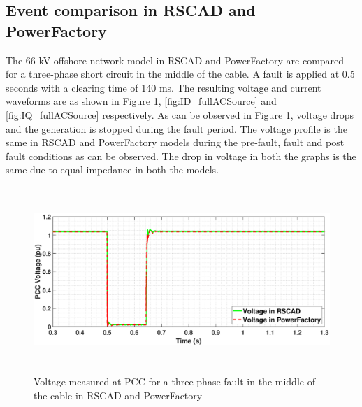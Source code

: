\subsection{Event comparison in RSCAD and PowerFactory}
The 66 kV offshore network model in RSCAD and PowerFactory are compared for a three-phase short circuit in the middle of the cable. A fault is applied at 0.5 seconds with a clearing time of 140 ms. The resulting voltage and current waveforms are as shown in Figure \ref{fig:VACP_comp},  \ref{fig:ID_fullACSource} and \ref{fig:IQ_fullACSource} respectively. As can be observed in Figure \ref{fig:VACP_comp}, voltage drops and the generation is stopped during the fault period. The voltage profile is the same in RSCAD and PowerFactory models during the pre-fault, fault and post fault conditions as can be observed. The drop in voltage in both the graphs is the same due to equal impedance in both the models. 

\begin{figure}[H]
    \includegraphics[height = 7cm,width = \textwidth]{Diagrams/Chapter_3/VACP_Comp_New_4.eps}
    \caption{Voltage measured at PCC for a three phase fault in the middle of the cable in RSCAD and PowerFactory}
    \label{fig:VACP_comp}
\end{figure}


